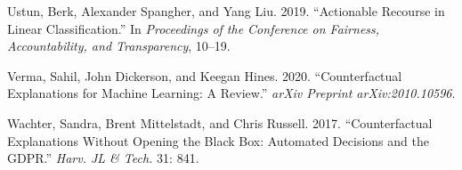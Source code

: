 \documentclass[
]{acmconf}
\newlength{\cslhangindent}
\newlength{\cslentryspacingunit} %
\newenvironment{CSLReferences}[2] %
 {%
  \setlength{\parindent}{0pt}
  \ifodd #1
  \let\oldpar\par
  \def\par{\hangindent=\cslhangindent\oldpar}
  \fi
  \setlength{\parskip}{#2\cslentryspacingunit}
 }%
 {}
\begin{document}
\begin{CSLReferences}{1}{0}
\leavevmode{}%
Ustun, Berk, Alexander Spangher, and Yang Liu. 2019. {``Actionable
Recourse in Linear Classification.''} In \emph{Proceedings of the
Conference on Fairness, Accountability, and Transparency}, 10--19.

\leavevmode{}%
Verma, Sahil, John Dickerson, and Keegan Hines. 2020. {``Counterfactual
Explanations for Machine Learning: A Review.''} \emph{arXiv Preprint
arXiv:2010.10596}.

\leavevmode{}%
Wachter, Sandra, Brent Mittelstadt, and Chris Russell. 2017.
{``Counterfactual Explanations Without Opening the Black Box: Automated
Decisions and the GDPR.''} \emph{Harv. JL \& Tech.} 31: 841.

\end{CSLReferences}
\end{document}
